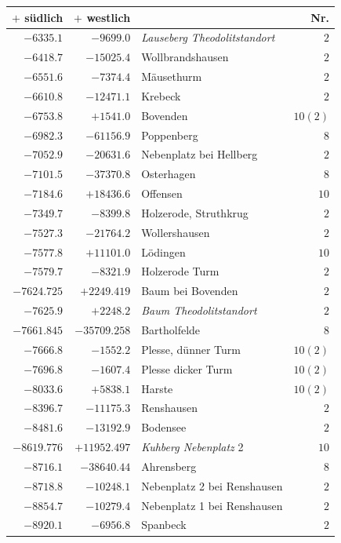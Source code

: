 \begin{center}\begingroup\fontsize{8}{9}\selectfont
\setlength{\tabcolsep}{4pt}
\begin{tabular}{r|r|p{170pt}|r}\hline
\(+\) südlich&\(+\) westlich&&Nr.\\\hline
\(-6335.1\)&\(-9699.0\)&\textit{Lauseberg Theodolitstandort}&\(2\)\\
\(-6418.7\)&\(-15025.4\)&Wollbrandshausen&\(2\)\\
\(-6551.6\)&\(-7374.4\)&Mäusethurm&\(2\)\\
\(-6610.8\)&\(-12471.1\)&Krebeck&\(2\)\\
\(-6753.8\)&\(+1541.0\)&Bovenden&\(10 (2)\)\\
\(-6982.3\)&\(-61156.9\)&Poppenberg&\(8\)\\
\(-7052.9\)&\(-20631.6\)&Nebenplatz bei Hellberg&\(2\)\\
\(-7101.5\)&\(-37370.8\)&Osterhagen&\(8\)\\
\(-7184.6\)&\(+18436.6\)&Offensen&\(10\)\\
\(-7349.7\)&\(-8399.8\)&Holzerode, Struthkrug&\(2\)\\
\(-7527.3\)&\(-21764.2\)&Wollershausen&\(2\)\\
\(-7577.8\)&\(+11101.0\)&Lödingen&\(10\)\\
\(-7579.7\)&\(-8321.9\)&Holzerode Turm&\(2\)\\
\(-7624.725\)&\(+2249.419\)&Baum bei Bovenden&\(2\)\\
\(-7625.9\)&\(+2248.2\)&\textit{Baum Theodolitstandort}&\(2\)\\
\(-7661.845\)&\(-35709.258\)&Bartholfelde&\(8\)\\
\(-7666.8\)&\(-1552.2\)&Plesse, dünner Turm&\(10 (2)\)\\
\(-7696.8\)&\(-1607.4\)&Plesse dicker Turm&\(10 (2)\)\\
\(-8033.6\)&\(+5838.1\)&Harste&\(10 (2)\)\\
\(-8396.7\)&\(-11175.3\)&Renshausen&\(2\)\\
\(-8481.6\)&\(-13192.9\)&Bodensee&\(2\)\\
\(-8619.776\)&\(+11952.497\)&\textit{Kuhberg Nebenplatz} 2&\(10\)\\
\(-8716.1\)&\(-38640.44\)&Ahrensberg&\(8\)\\
\(-8718.8\)&\(-10248.1\)&Nebenplatz 2 bei Renshausen&\(2\)\\
\(-8854.7\)&\(-10279.4\)&Nebenplatz 1 bei Renshausen&\(2\)\\
\(-8920.1\)&\(-6956.8\)&Spanbeck&\(2\)\\

\end{tabular}
\end{center}
